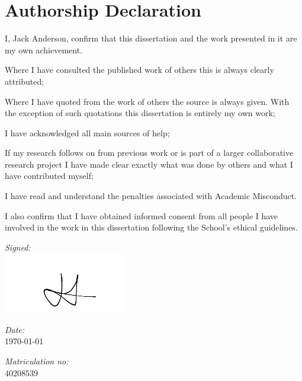 
\section*{Authorship Declaration}
\vspace{0.5cm}
\begin{flushleft}
I, Jack Anderson, confirm that this dissertation and the work presented in it are my own achievement.\newline

Where I have consulted the published work of others this is always clearly attributed;\newline

Where I have quoted from the work of others the source is always given. With the exception of such quotations this dissertation is entirely my own work;\newline

I have acknowledged all main sources of help; \newline

If my research follows on from previous work or is part of a larger collaborative research project I have made clear exactly what was done by others and what I have contributed myself;\newline

I have read and understand the penalties associated with Academic Misconduct.\newline

I also confirm that I have obtained informed consent from all people I have involved in the work in this dissertation following the School's ethical guidelines.\newline
\end{flushleft}

\begin{flushleft} \large
\emph{Signed:} \\
\includegraphics[trim={0 .75cm 0 .95cm},clip, width=0.4\textwidth, center]{figures/signature}
\end{flushleft}


\begin{flushleft} \large
\emph{Date:} \\
\today
\end{flushleft}

\vspace{.5cm}

\begin{flushleft} \large
\emph{Matriculation no: }  \\
40208539
\end{flushleft}
